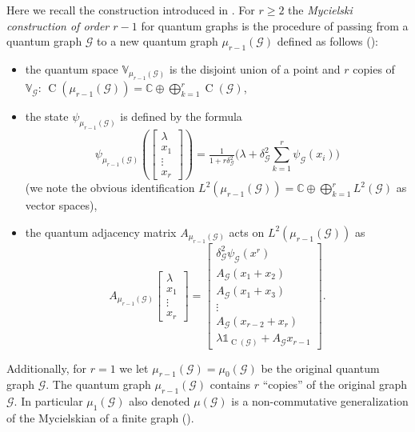 \documentclass[11pt,reqno]{amsart}
\newcommand{\I}{\mathds{1}}
\newcommand{\CC}{\mathbb{C}}
\DeclareMathOperator{\C}{C}
\begin{document}
Here we recall the construction introduced in \cite{BochKaspMyc}. For $r\geq{2}$ the \emph{Mycielski construction of order $r-1$} for quantum graphs is the procedure of passing from a quantum graph $\mathcal{G}$ to a new quantum graph $\mu_{r-1}(\mathcal{G})$ defined as follows (\cite[Section 4]{BochKaspMyc}):
\begin{itemize}
\item the quantum space $\mathbb{V}_{\scriptscriptstyle\mu_{r-1}(\mathcal{G})}$ is the disjoint union of a point and $r$ copies of $\mathbb{V}_{\scriptscriptstyle\mathcal{G}}$: $\C(\mu_{r-1}(\mathcal{G}))=\CC\oplus\bigoplus\limits_{k=1}^r\C(\mathcal{G})$,
\item the state $\psi_{\scriptscriptstyle\mu_{r-1}(\mathcal{G})}$ is defined by the formula
\[
\psi_{\scriptscriptstyle\mu_{r-1}(\mathcal{G})}
\left(\left[
\begin{smallmatrix}
\lambda\\x_1\\[-2pt]\vdots\\[2pt]x_r
\end{smallmatrix}
\right]\right)=\tfrac{1}{1+r\delta_{\scriptscriptstyle\mathcal{G}}^2}\biggl(\lambda+\delta_{\scriptscriptstyle\mathcal{G}}^2\sum_{k=1}^r\psi_{\scriptscriptstyle\mathcal{G}}(x_i)\biggr)
\]
(we note  the obvious identification $L^2(\mu_{r-1}(\mathcal{G}))=\CC\oplus\bigoplus\limits_{k=1}^r L^2(\mathcal{G})$ as vector spaces),
\item the quantum adjacency matrix $A_{\scriptscriptstyle\mu_{r-1}(\mathcal{G})}$ acts on $L^2(\mu_{r-1}(\mathcal{G}))$ as
\[
A_{\scriptscriptstyle\mu_{r-1}(\mathcal{G})}
\left[\begin{smallmatrix}
\lambda\\x_1\\[-2pt]\vdots\\[2pt]x_r
\end{smallmatrix}\right]=
\left[\begin{smallmatrix}
\delta_{\scriptscriptstyle\mathcal{G}}^2\psi_{\scriptscriptstyle\mathcal{G}}(x^r)\\
A_{\scriptscriptstyle\mathcal{G}}(x_1+x_2)\\
A_{\scriptscriptstyle\mathcal{G}}(x_1+x_3)\\[-2pt]\vdots\\[2pt]
A_{\scriptscriptstyle\mathcal{G}}(x_{r-2}+x_{r})\\
\lambda\I_{\C(\mathcal{G})}+A_{\scriptscriptstyle\mathcal{G}}x_{r-1}
\end{smallmatrix}\right].
\]
\end{itemize}
Additionally, for $r=1$ we let $\mu_{r-1}(\mathcal{G})=\mu_0(\mathcal{G})$ be the original quantum graph $\mathcal{G}$. The quantum graph $\mu_{r-1}(\mathcal{G})$ contains $r$ ``copies'' of the original graph $\mathcal{G}$. In particular $\mu_1(\mathcal{G})$ also denoted $\mu(\mathcal{G})$ is a non-commutative generalization of the Mycielskian of a finite graph (\cite{Mycielski}).%
\end{document}
